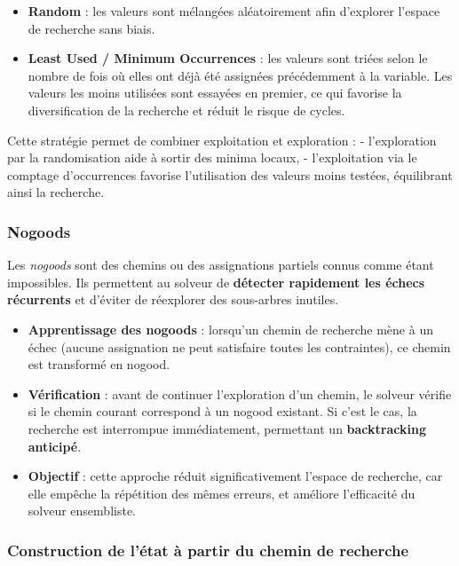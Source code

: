 \documentclass{article}
\begin{document}
\begin{itemize}
    \item \textbf{Random} : les valeurs sont mélangées aléatoirement afin d'explorer l'espace de recherche sans biais.
    
    \item \textbf{Least Used / Minimum Occurrences} : les valeurs sont triées selon le nombre de fois où elles ont déjà été assignées précédemment à la variable. 
    Les valeurs les moins utilisées sont essayées en premier, ce qui favorise la diversification de la recherche et réduit le risque de cycles.
\end{itemize}

Cette stratégie permet de combiner exploitation et exploration :  
- l'exploration par la randomisation aide à sortir des minima locaux,  
- l'exploitation via le comptage d'occurrences favorise l'utilisation des valeurs moins testées, équilibrant ainsi la recherche.


\subsubsection{Nogoods}

Les \emph{nogoods} sont des chemins ou des assignations partiels connus comme étant impossibles. 
Ils permettent au solveur de \textbf{détecter rapidement les échecs récurrents} et d'éviter de réexplorer des sous-arbres inutiles.

\begin{itemize}
    \item \textbf{Apprentissage des nogoods} : lorsqu'un chemin de recherche mène à un échec (aucune assignation ne peut satisfaire toutes les contraintes), ce chemin est transformé en nogood.

    \item \textbf{Vérification} : avant de continuer l'exploration d'un chemin, le solveur vérifie si le chemin courant correspond à un nogood existant. 
    Si c'est le cas, la recherche est interrompue immédiatement, permettant un \textbf{backtracking anticipé}.

    \item \textbf{Objectif} : cette approche réduit significativement l'espace de recherche, car elle empêche la répétition des mêmes erreurs, et améliore l'efficacité du solveur ensembliste.
\end{itemize}

\subsubsection{Construction de l'état à partir du chemin de recherche}
\end{document}
